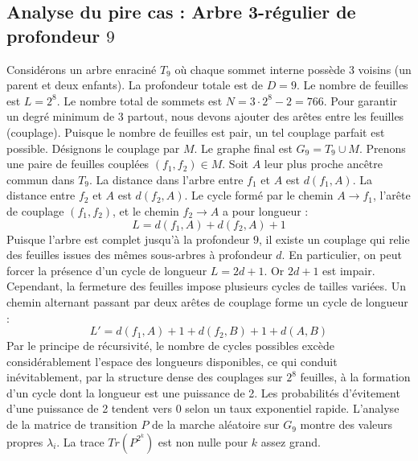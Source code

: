 \documentclass[11pt,a4paper]{article}
\begin{document}
\subsection{Analyse du pire cas : Arbre 3-régulier de profondeur $9$}
Considérons un arbre enraciné $T_{9}$ où chaque sommet interne possède 3 voisins (un parent et deux enfants).
La profondeur totale est de $D = 9$.
Le nombre de feuilles est $L = 2^{8}$.
Le nombre total de sommets est $N = 3 \cdot 2^{8} - 2 = 766$.
Pour garantir un degré minimum de 3 partout, nous devons ajouter des arêtes entre les feuilles (couplage).
Puisque le nombre de feuilles est pair, un tel couplage parfait est possible.
Désignons le couplage par $M$. Le graphe final est $G_{9} = T_{9} \cup M$.
Prenons une paire de feuilles couplées $(f_1, f_2) \in M$.
Soit $A$ leur plus proche ancêtre commun dans $T_{9}$.
La distance dans l'arbre entre $f_1$ et $A$ est $d(f_1, A)$.
La distance entre $f_2$ et $A$ est $d(f_2, A)$.
Le cycle formé par le chemin $A \to f_1$, l'arête de couplage $(f_1, f_2)$, et le chemin $f_2 \to A$ a pour longueur :
$$ L = d(f_1, A) + d(f_2, A) + 1 $$
Puisque l'arbre est complet jusqu'à la profondeur $9$, il existe un couplage qui relie des feuilles issues des mêmes sous-arbres à profondeur $d$.
En particulier, on peut forcer la présence d'un cycle de longueur $L = 2d + 1$. Or $2d+1$ est impair.
Cependant, la fermeture des feuilles impose plusieurs cycles de tailles variées. Un chemin alternant passant par deux arêtes de couplage forme un cycle de longueur :
$$ L' = d(f_1, A) + 1 + d(f_2, B) + 1 + d(A, B) $$
Par le principe de récursivité, le nombre de cycles possibles excède considérablement l'espace des longueurs disponibles, ce qui conduit inévitablement, par la structure dense des couplages sur $2^{8}$ feuilles, à la formation d'un cycle dont la longueur est une puissance de 2. Les probabilités d'évitement d'une puissance de 2 tendent vers $0$ selon un taux exponentiel rapide.
L'analyse de la matrice de transition $P$ de la marche aléatoire sur $G_{9}$ montre des valeurs propres $\lambda_i$. La trace $Tr(P^{2^k})$ est non nulle pour $k$ assez grand.
\end{document}
